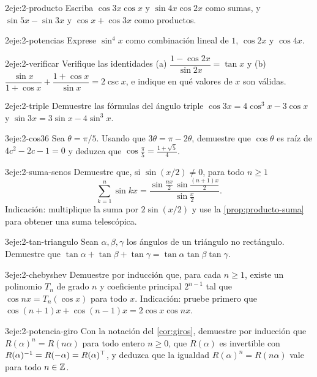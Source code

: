 \begin{ejercicio}{2}{eje:2-producto}
Escriba $\cos3x\cos x$ y $\sin4x\cos2x$ como sumas, y $\sin5x-\sin3x$ y $\cos x+\cos3x$ como productos.
\end{ejercicio}

\begin{ejercicio}{2}{eje:2-potencias}
Exprese $\sin^{4}x$ como combinación lineal de $1$, $\cos2x$ y $\cos4x$.
\end{ejercicio}

\begin{ejercicio}{2}{eje:2-verificar}
Verifique las identidades (a) $\dfrac{1-\cos2x}{\sin2x}=\tan x$ y (b) $\dfrac{\sin x}{1+\cos x}+\dfrac{1+\cos x}{\sin x}=2\csc x$, e indique en qué valores de $x$ son válidas.
\end{ejercicio}

\begin{ejercicio}{2}{eje:2-triple}
Demuestre las fórmulas del ángulo triple $\cos3x=4\cos^{3}x-3\cos x$ y $\sin3x=3\sin x-4\sin^{3}x$.
\end{ejercicio}

\begin{ejercicio}{3}{eje:2-cos36}
Sea $\theta=\pi/5$. Usando que $3\theta=\pi-2\theta$, demuestre que $\cos\theta$ es raíz de $4c^{2}-2c-1=0$ y deduzca que $\cos\frac{\pi}{5}=\frac{1+\sqrt5}{4}$.
\end{ejercicio}

\begin{ejercicio}{3}{eje:2-suma-senos}
Demuestre que, si $\sin(x/2)\ne 0$, para todo $n\ge1$
\[
\sum_{k=1}^{n}\sin kx=\frac{\sin\frac{nx}{2}\,\sin\frac{(n+1)x}{2}}{\sin\frac{x}{2}}.
\]
Indicación: multiplique la suma por $2\sin(x/2)$ y use la \cref{prop:producto-suma} para obtener una suma telescópica.
\end{ejercicio}

\begin{ejercicio}{3}{eje:2-tan-triangulo}
Sean $\alpha,\beta,\gamma$ los ángulos de un triángulo no rectángulo. Demuestre que $\tan\alpha+\tan\beta+\tan\gamma=\tan\alpha\tan\beta\tan\gamma$.
\end{ejercicio}

\begin{ejercicio}{3}{eje:2-chebyshev}
Demuestre por inducción que, para cada $n\ge1$, existe un polinomio $T_n$ de grado $n$ y coeficiente principal $2^{n-1}$ tal que $\cos nx=T_n(\cos x)$ para todo $x$. Indicación: pruebe primero que $\cos(n+1)x+\cos(n-1)x=2\cos x\cos nx$.
\end{ejercicio}

\begin{ejercicio}{3}{eje:2-potencia-giro}
Con la notación del \cref{cor:giros}, demuestre por inducción que $R(\alpha)^{n}=R(n\alpha)$ para todo entero $n\ge0$, que $R(\alpha)$ es invertible con $R(\alpha)^{-1}=R(-\alpha)=R(\alpha)^{\top}$, y deduzca que la igualdad $R(\alpha)^{n}=R(n\alpha)$ vale para todo $n\in\mathbb{Z}$.
\end{ejercicio}
